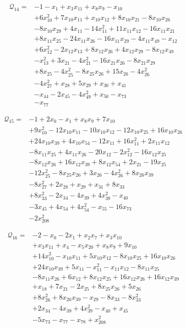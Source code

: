 \begin{align*}
\mathcal{Q}_{14}={}&-1-x_{1}+x_{3}x_{11}+x_{8}x_{9}-x_{10}\\
&+6x_{10}^{2}+7x_{10}x_{11}+x_{10}x_{12}+8x_{10}x_{21}-8x_{10}x_{26}\\
&-8x_{10}x_{29}+4x_{11}-14x_{11}^{2}+11x_{11}x_{12}-16x_{11}x_{21}\\
&+8x_{11}x_{25}-24x_{11}x_{26}-16x_{11}x_{29}-4x_{11}x_{49}-x_{12}\\
&+6x_{12}^{2}-2x_{12}x_{13}+8x_{12}x_{26}+4x_{12}x_{29}-8x_{12}x_{49}\\
&-x_{13}^{2}+3x_{21}-4x_{21}^{2}-16x_{21}x_{26}-8x_{21}x_{29}\\
&+8x_{25}-4x_{25}^{2}-8x_{25}x_{26}+15x_{26}-4x_{26}^{2}\\
&-4x_{27}^{2}+x_{28}+5x_{29}+x_{30}+x_{41}\\
&-x_{44}-2x_{45}-4x_{49}^{2}+x_{50}-x_{73}\\
&-x_{77}
\end{align*}

\begin{align*}
\mathcal{Q}_{15}={}&-1+2x_{0}-x_{1}+x_{8}x_{9}+7x_{10}\\
&+9x_{10}^{2}-12x_{10}x_{11}-10x_{10}x_{12}-12x_{10}x_{25}+16x_{10}x_{26}\\
&+24x_{10}x_{39}+4x_{10}x_{54}-12x_{11}+16x_{11}^{2}+2x_{11}x_{12}\\
&-8x_{11}x_{25}+4x_{11}x_{26}-20x_{12}-2x_{12}^{2}-16x_{12}x_{25}\\
&-8x_{12}x_{26}+16x_{12}x_{39}+8x_{12}x_{54}+2x_{21}-19x_{25}\\
&-12x_{25}^{2}-8x_{25}x_{26}+3x_{26}-4x_{26}^{2}+8x_{26}x_{39}\\
&-8x_{27}^{2}+2x_{28}+x_{29}+x_{31}+8x_{33}\\
&+8x_{33}^{2}-2x_{34}-4x_{39}+4x_{39}^{2}-x_{40}\\
&-3x_{45}+4x_{54}+4x_{54}^{2}-x_{55}-16x_{73}\\
&-2x_{208}^{2}
\end{align*}

\begin{align*}
\mathcal{Q}_{16}={}&-2-x_{0}-2x_{1}+x_{2}x_{7}+x_{3}x_{10}\\
&+x_{3}x_{11}+x_{4}-x_{5}x_{20}+x_{8}x_{9}+9x_{10}\\
&+14x_{10}^{2}-x_{10}x_{11}+5x_{10}x_{12}-8x_{10}x_{25}+16x_{10}x_{26}\\
&+24x_{10}x_{39}+5x_{11}-x_{11}^{2}-x_{11}x_{12}-8x_{11}x_{25}\\
&-8x_{11}x_{26}+6x_{12}+8x_{12}x_{25}+16x_{12}x_{26}+16x_{12}x_{39}\\
&+x_{18}+7x_{21}-2x_{25}+8x_{25}x_{26}+5x_{26}\\
&+8x_{26}^{2}+8x_{26}x_{39}-x_{29}-8x_{33}-8x_{33}^{2}\\
&+2x_{34}-4x_{39}+4x_{39}^{2}-x_{40}+x_{45}\\
&-5x_{73}-x_{77}-x_{78}+x_{208}^{2}
\end{align*}

